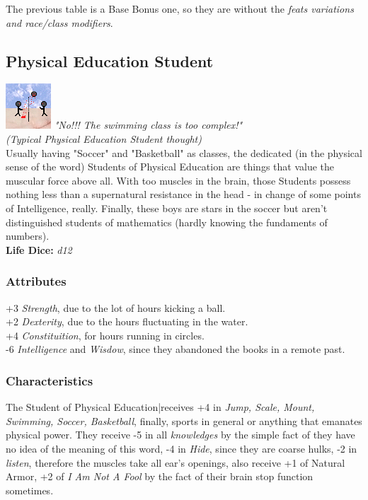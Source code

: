 \documentclass[ letterpaper,12pt]{article}
\begin{document}
The previous table is a Base Bonus one, so they are without the {\it feats variations and race/class modifiers}.\\

\subsection{Physical Education Student}
\includegraphics{../data/classes/Img/edfisica.png}
{\it "No!!! The swimming class is too complex!"\\(Typical Physical Education Student thought)}\\

Usually having "Soccer" and "Basketball" as classes, the dedicated (in the physical sense of the word) Students of Physical Education are things that value the muscular force above all.  With too muscles in the brain, those Students possess nothing less than a supernatural resistance in the head - in change of some points of Intelligence, really.  Finally, these boys are stars in the soccer but aren't distinguished students of mathematics (hardly knowing the fundaments of numbers).\\

{\bf Life Dice:} {\it d12}

\subsubsection{Attributes}
+3 {\it Strength}, due to the lot of hours kicking a ball.\\
+2 {\it Dexterity}, due to the hours fluctuating in the water.\\
+4 {\it Constituition}, for hours running in circles.\\
-6 {\it Intelligence} and {\it Wisdow}, since they abandoned the books in a remote past.\\

\subsubsection{Characteristics}
The   Student   of   Physical   Education|receives  +4  in  {\it Jump,   Scale,   Mount, Swimming,  Soccer,  Basketball},  finally, sports  in  general  or   anything that emanates physical power. They receive -5 in all {\it knowledges} by the simple fact of they have no idea of the meaning of this word, -4 in {\it Hide}, since they are coarse hulks, -2 in {\it listen}, therefore  the muscles take all ear's openings, also receive +1 of Natural Armor, +2 of {\it I Am Not A Fool} by the fact of their brain stop function sometimes.\\
\end{document}
